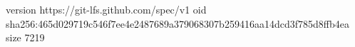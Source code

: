 version https://git-lfs.github.com/spec/v1
oid sha256:465d029719c546f7ee4e2487689a379068307b259416aa14dcd3f785d8ffb4ea
size 7219
